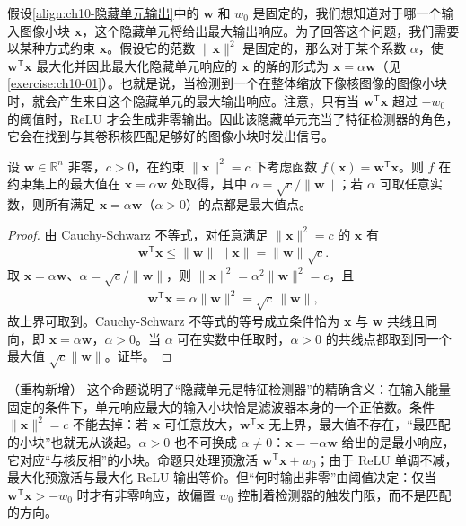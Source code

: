 \documentclass[../../main.tex]{subfiles}
\begin{document}
假设\eqref{align:ch10-隐藏单元输出}中的 $\mathbf{w}$ 和 $w_0$ 是固定的，我们想知道对于哪一个输入图像小块 $\mathbf{x}$，这个隐藏单元将给出最大输出响应。为了回答这个问题，我们需要以某种方式约束 $\mathbf{x}$。假设它的范数 $\|\mathbf{x}\|^2$ 是固定的，那么对于某个系数 $\alpha$，使 $\mathbf{w}^{\mathsf{T}}\mathbf{x}$ 最大化并因此最大化隐藏单元响应的 $\mathbf{x}$ 的解的形式为 $\mathbf{x}=\alpha\mathbf{w}$（见\cref{exercise:ch10-01}）。也就是说，当检测到一个在整体缩放下像核图像的图像小块时，就会产生来自这个隐藏单元的最大输出响应。注意，只有当 $\mathbf{w}^{\mathsf{T}}\mathbf{x}$ 超过 $-w_0$ 的阈值时，ReLU 才会生成非零输出。因此该隐藏单元充当了特征检测器的角色，它会在找到与其卷积核匹配足够好的图像小块时发出信号。

\begin{proposition}[最大响应方向]\label{proposition:ch10-最大响应方向}
设 $\mathbf{w}\in\mathbb{R}^{n}$ 非零，$c>0$，在约束 $\|\mathbf{x}\|^2=c$ 下考虑函数 $f(\mathbf{x})=\mathbf{w}^{\mathsf{T}}\mathbf{x}$。则 $f$ 在约束集上的最大值在 $\mathbf{x}=\alpha\mathbf{w}$ 处取得，其中 $\alpha=\sqrt{c}/\|\mathbf{w}\|$；若 $\alpha$ 可取任意实数，则所有满足 $\mathbf{x}=\alpha\mathbf{w}$（$\alpha>0$）的点都是最大值点。
\end{proposition}
\begin{proof}
由 Cauchy-Schwarz 不等式，对任意满足 $\|\mathbf{x}\|^2=c$ 的 $\mathbf{x}$ 有
\begin{align*}
  \mathbf{w}^{\mathsf{T}}\mathbf{x}\leqslant \|\mathbf{w}\|\,\|\mathbf{x}\|=\|\mathbf{w}\|\sqrt{c}.
\end{align*}
取 $\mathbf{x}=\alpha\mathbf{w}$、$\alpha=\sqrt{c}/\|\mathbf{w}\|$，则 $\|\mathbf{x}\|^2=\alpha^2\|\mathbf{w}\|^2=c$，且
\begin{align*}
  \mathbf{w}^{\mathsf{T}}\mathbf{x}=\alpha\|\mathbf{w}\|^2=\sqrt{c}\,\|\mathbf{w}\|,
\end{align*}
故上界可取到。Cauchy-Schwarz 不等式的等号成立条件恰为 $\mathbf{x}$ 与 $\mathbf{w}$ 共线且同向，即 $\mathbf{x}=\alpha\mathbf{w}$，$\alpha>0$。当 $\alpha$ 可在实数中任取时，$\alpha>0$ 的共线点都取到同一个最大值 $\sqrt{c}\|\mathbf{w}\|$。证毕。
\end{proof}

\begin{remark}（重构新增）
这个命题说明了“隐藏单元是特征检测器”的精确含义：在输入能量固定的条件下，单元响应最大的输入小块恰是滤波器本身的一个正倍数。条件 $\|\mathbf{x}\|^2=c$ 不能去掉：若 $\mathbf{x}$ 可任意放大，$\mathbf{w}^{\mathsf{T}}\mathbf{x}$ 无上界，最大值不存在，“最匹配的小块”也就无从谈起。$\alpha>0$ 也不可换成 $\alpha\neq0$：$\mathbf{x}=-\alpha\mathbf{w}$ 给出的是最小响应，它对应“与核反相”的小块。命题只处理预激活 $\mathbf{w}^{\mathsf{T}}\mathbf{x}+w_0$；由于 ReLU 单调不减，最大化预激活与最大化 ReLU 输出等价。但“何时输出非零”由阈值决定：仅当 $\mathbf{w}^{\mathsf{T}}\mathbf{x}>-w_0$ 时才有非零响应，故偏置 $w_0$ 控制着检测器的触发门限，而不是匹配的方向。
\end{remark}
\end{document}

